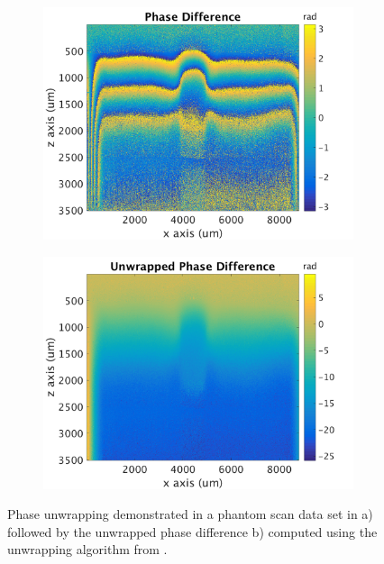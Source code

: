 \begin{figure}[t]
	\centering
	\begin{subfigure}{0.49\textwidth}
		\centering
		\includegraphics[width=\textwidth]{figures/phase_difference.png}
	\end{subfigure}
	\begin{subfigure}{0.49\textwidth}
		\centering
		\includegraphics[width=\textwidth]{figures/unwrapped_phase.png}
	\end{subfigure}
	\label{phase_wrapping}
	\caption{Phase unwrapping demonstrated in a phantom scan data set in a) followed by the unwrapped phase difference b) computed using the unwrapping algorithm from \cite{kennedy_optical_2014}.}
\end{figure}

